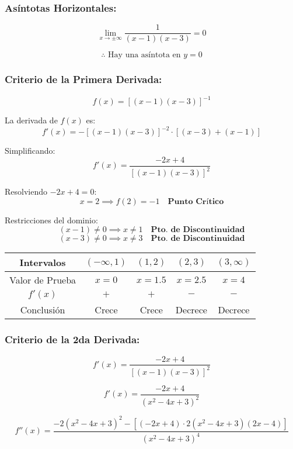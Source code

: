 \subsubsection*{Asíntotas Horizontales:}

\[
\lim_{x \to \pm\infty} \frac{1}{(x-1)(x-3)} = 0
\]

\[
\therefore \text{ Hay una asíntota en } y = 0
\]

\subsubsection*{Criterio de la Primera Derivada:}  

\[
f(x) = [(x - 1)(x - 3)]^{-1}
\]

La derivada de \( f(x) \) es:
\[
f'(x) = -[(x - 1)(x - 3)]^{-2} \cdot [(x - 3) + (x - 1)]
\]

Simplificando:
\[
f'(x) = \frac{-2x + 4}{[(x - 1)(x - 3)]^2}
\]

Resolviendo \( -2x + 4 = 0 \):  
\[
x = 2 \implies f(2) = -1 \quad \textbf{Punto Crítico}
\]

Restricciones del dominio:
\[
(x - 1) \neq 0 \implies x \neq 1 \quad \textbf{Pto. de Discontinuidad}
\]
\[
(x - 3) \neq 0 \implies x \neq 3 \quad \textbf{Pto. de Discontinuidad}
\]


\begin{center}
    \begin{tabular}{|c|c|c|c|c|}
        \hline
        Intervalos & $(-\infty,1)$ & $(1,2)$ & $(2,3)$ & $(3,\infty)$ \\
        \hline
        Valor de Prueba & $x=0$ & $x=1.5$ & $x=2.5$ & $x=4$ \\
        \hline
        $f'(x)$ & $+$ & $+$ & $-$ & $-$ \\
        \hline
        Conclusión & Crece & Crece & Decrece & Decrece \\
        \hline
    \end{tabular}
\end{center}


\subsubsection*{Criterio de la 2da Derivada:}

\[
f'(x) = \frac{-2x + 4}{[ (x - 1)(x - 3) ]^2}
\]

\[
f'(x) = \frac{-2x + 4}{(x^2 - 4x + 3)^2}
\]

\[
f''(x) = \frac{-2 (x^2 - 4x + 3)^2 - [ (-2x + 4) \cdot 2 (x^2 - 4x + 3) (2x - 4) ]}{(x^2 - 4x + 3)^4}
\]

